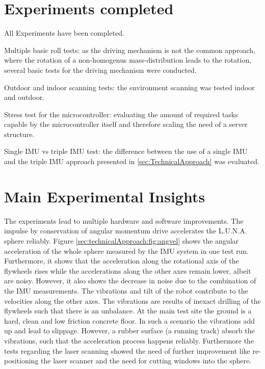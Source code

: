\documentclass[graybox]{svmult}
\newcommand{\1}{\mathbbm{1}}                 %
\begin{document}



\section{Experiments completed}

All Experiments have been completed.

Multiple basic roll tests: as the driving mechanism is not the common approach, where the rotation of a non-homogenus mass-distribution leads to the rotation, several basic tests for the driving mechanism were conducted. 


Outdoor and indoor scanning tests: the environment scanning was tested indoor and outdoor. 

Stress test for the microcontroller: evaluating the amount of required tasks capable by the microcontroller itself  and therefore scaling the need of a server structure.

Single IMU vs triple IMU test: the difference between the use of a single IMU and the triple IMU approach presented in 
\ref{sec:TechnicalApproach} was evaluated.

\section{Main Experimental Insights}

The experiments lead to multiple hardware and software improvements.
The impulse by conservation of angular momentum drive accelerates the L.U.N.A. sphere reliably.
Figure \ref{sec:technicalApproach:fig:angvel} shows the angular acceleration of the whole sphere measured by the IMU system in one test run. 
Furthermore, it shows that the acceleration along the rotational axis of the flywheels rises while the accelerations along the other axes remain lower, albeit are noisy. 
However, it also shows the decrease in noise due to the combination of the IMU measurements.
The vibrations and tilt of the robot contribute to the velocities along the other axes.
The vibrations are results of inexact drilling of the flywheels such that there is an unbalance.
At the main test site the ground is a hard, clean and low friction concrete floor.
In such a scenario the vibrations add up and lead to slippage.
However, a rubber surface (a running track) absorb the vibrations, such that the acceleration process happens reliably.\newline
Furthermore the tests regarding the laser scanning showed the need of further improvement like re-positioning the laser scanner and the need for cutting windows into the sphere.
\end{document}
